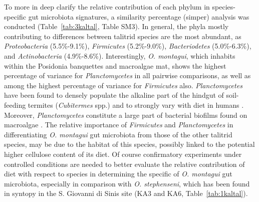 To more in deep clarify the relative contribution of each phylum in species-specific gut microbiota signatures, a similarity percentage (simper) analysis was conducted (Table~\ref{tab:3kaltal}, Table SM3). In general, the phyla mostly contributing to differences between talitrid species are the most abundant, as \textit{Proteobacteria} (5.5\%-9.1\%), \textit{Firmicutes }(5.2\%-9.0\%), \textit{Bacteriodetes} (5.0\%-6.3\%), and \textit{Actinobacteria} (4.9\%-8.6\%). Interestingly, \textit{O. montagui}, which inhabits within the Posidonia banquettes  and macroalgae mat, shows the highest percentage of variance for \textit{Planctomycetes} in all pairwise comparisons, as well as among the highest percentage of variance for \textit{Firmicutes} also. \textit{Planctomycetes} have been found to densely populate the alkaline part of the hindgut of soil-feeding termites (\textit{Cubitermes} spp.) \cite{kohler2008novel} and to strongly vary with diet in humans \cite{cayrou2013molecular}. Moreover, \textit{Planctomycetes} constitute a large part of bacterial biofilms found on macroalgae \cite{lage2014planctomycetes}. The relative importance of \textit{Firmicutes} and \textit{Planctomycetes} in differentiating \textit{O. montagui }gut\textit{ }microbiota from those of the other talitrid species, may be due to the habitat of this species, possibly linked to the potential higher cellulose content of its diet. Of course confirmatory experiments under controlled conditions are needed to better evaluate the relative contribution of diet with respect to species in determining the specific of \textit{O. montagui }gut microbiota, especially in comparison with \textit{O. stephenseni}, which has been found in syntopy in the S. Giovanni di Sinis site (KA3 and KA6, Table~\ref{tab:1kaltal}).\\
